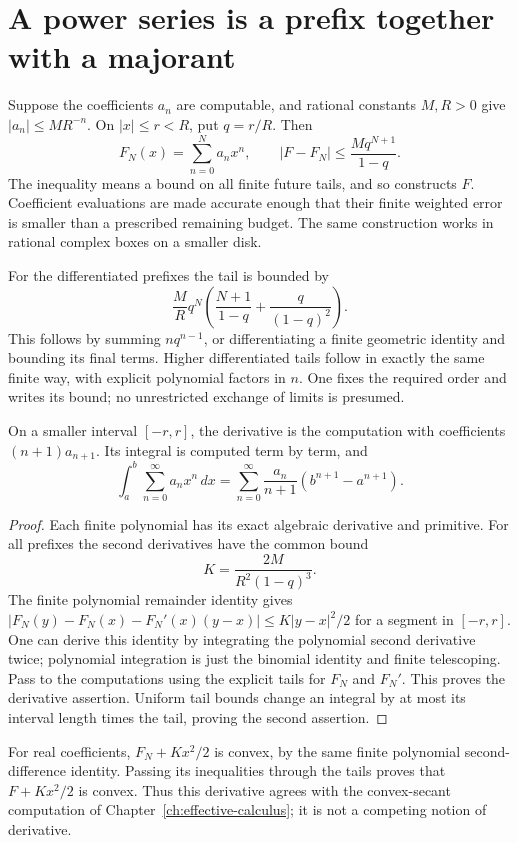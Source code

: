 \section{A power series is a prefix together with a majorant}
Suppose the coefficients $a_n$ are computable, and rational constants
$M,R>0$ give $|a_n|\le M R^{-n}$.  On $|x|\le r<R$, put $q=r/R$.
Then
\[
 F_N(x)=\sum_{n=0}^Na_nx^n,\qquad
 |F-F_N|\le\frac{M q^{N+1}}{1-q}.
\]
The inequality means a bound on all finite future tails, and so constructs
$F$.  Coefficient evaluations are made accurate enough that their finite
weighted error is smaller than a prescribed remaining budget.  The same
construction works in rational complex boxes on a smaller disk.

For the differentiated prefixes the tail is bounded by
\[
 \frac{M}{R}q^N\left(\frac{N+1}{1-q}+\frac{q}{(1-q)^2}\right).
\]
This follows by summing $nq^{n-1}$, or differentiating a finite geometric
identity and bounding its final terms.  Higher differentiated tails follow
in exactly the same finite way, with explicit polynomial factors in $n$.
One fixes the required order and writes its bound; no unrestricted exchange
of limits is presumed.

\begin{theorem}
\label{thm:finite-taylor-ftc-prefix}
On a smaller interval $[-r,r]$, the derivative is the computation with
coefficients $(n+1)a_{n+1}$.  Its integral is computed term by term, and
\[
 \int_a^b\sum_{n=0}^{\infty}a_nx^n\,dx
   =\sum_{n=0}^{\infty}\frac{a_n}{n+1}(b^{n+1}-a^{n+1}).
\]
\end{theorem}
\begin{proof}
Each finite polynomial has its exact algebraic derivative and primitive.
For all prefixes the second derivatives have the common bound
\[
 K=\frac{2M}{R^2(1-q)^3}.
\]
The finite polynomial remainder identity gives
$|F_N(y)-F_N(x)-F_N'(x)(y-x)|\le K|y-x|^2/2$ for a segment in
$[-r,r]$.  One can derive this identity by integrating the polynomial
second derivative twice; polynomial integration is just the binomial
identity and finite telescoping.  Pass to the computations using the
explicit tails for $F_N$ and $F_N'$.  This proves the derivative assertion.
Uniform tail bounds change an integral by at most its interval length
times the tail, proving the second assertion.
\end{proof}

For real coefficients, $F_N+Kx^2/2$ is convex, by the same finite polynomial
second-difference identity.  Passing its inequalities through the tails
proves that $F+Kx^2/2$ is convex.  Thus this derivative agrees with the
convex-secant computation of Chapter~\ref{ch:effective-calculus}; it is not
a competing notion of derivative.

